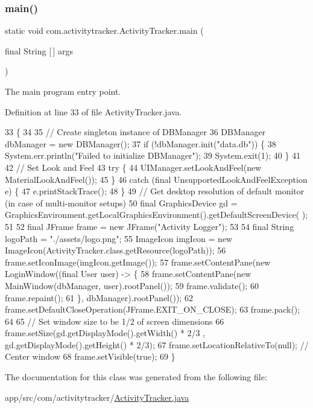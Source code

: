 \subsubsection{\texorpdfstring{main()}{main()}}
{\footnotesize\ttfamily static void com.\+activitytracker.\+Activity\+Tracker.\+main (\begin{DoxyParamCaption}\item[{final String \mbox{[}$\,$\mbox{]}}]{args }\end{DoxyParamCaption})\hspace{0.3cm}{\ttfamily [static]}}

The main program entry point. 

Definition at line 33 of file Activity\+Tracker.\+java.


\begin{DoxyCode}
33                                                  \{
34 
35         \textcolor{comment}{// Create singleton instance of DBManager}
36         DBManager dbManager = \textcolor{keyword}{new} DBManager();
37         \textcolor{keywordflow}{if} (!dbManager.init(\textcolor{stringliteral}{"data.db"})) \{
38             System.err.println(\textcolor{stringliteral}{"Failed to initialize DBManager"});
39             System.exit(1);
40         \}
41 
42         \textcolor{comment}{// Set Look and Feel}
43         \textcolor{keywordflow}{try} \{
44             UIManager.setLookAndFeel(\textcolor{keyword}{new} MaterialLookAndFeel());
45         \}
46         \textcolor{keywordflow}{catch} (\textcolor{keyword}{final} UnsupportedLookAndFeelException e) \{
47             e.printStackTrace();
48         \}
49         \textcolor{comment}{// Get desktop resolution of default monitor (in case of multi-monitor setups)}
50         \textcolor{keyword}{final} GraphicsDevice gd = GraphicsEnvironment.getLocalGraphicsEnvironment().getDefaultScreenDevice(
      );
51 
52         \textcolor{keyword}{final} JFrame frame = \textcolor{keyword}{new} JFrame(\textcolor{stringliteral}{"Activity Logger"});
53 
54         \textcolor{keyword}{final} String logoPath = \textcolor{stringliteral}{"./assets/logo.png"};
55         ImageIcon imgIcon = \textcolor{keyword}{new} ImageIcon(ActivityTracker.class.getResource(logoPath));
56         frame.setIconImage(imgIcon.getImage());
57         frame.setContentPane(\textcolor{keyword}{new} LoginWindow((\textcolor{keyword}{final} User user) -> \{
58             frame.setContentPane(\textcolor{keyword}{new} MainWindow(dbManager, user).rootPanel());
59             frame.validate();
60             frame.repaint();
61         \}, dbManager).rootPanel());
62         frame.setDefaultCloseOperation(JFrame.EXIT\_ON\_CLOSE);
63         frame.pack();
64 
65         \textcolor{comment}{// Set window size to be 1/2 of screen dimensions}
66         frame.setSize(gd.getDisplayMode().getWidth() * 2/3 , gd.getDisplayMode().getHeight() * 2/3);
67         frame.setLocationRelativeTo(null); \textcolor{comment}{// Center window}
68         frame.setVisible(\textcolor{keyword}{true});
69     \}
\end{DoxyCode}


The documentation for this class was generated from the following file\+:\begin{DoxyCompactItemize}
\item 
app/src/com/activitytracker/\mbox{\hyperlink{_activity_tracker_8java}{Activity\+Tracker.\+java}}\end{DoxyCompactItemize}
